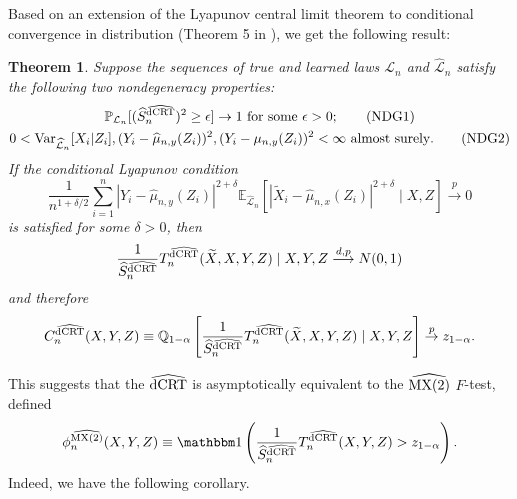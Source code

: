 \documentclass[aos]{imsart}
\theoremstyle{plain}
\newtheorem{theorem}{Theorem}
\theoremstyle{remark}
\newcommand{\E}{\mathbb E}								%
\newcommand{\V}{\mathrm{Var}}							%
\renewcommand{\P}{\mathbb{P}}							%
\newcommand{\Q}{\mathbb{Q}}								%
\newcommand{\indicator}{\mathbbm 1}						%
\newcommand{\convp}{\overset p \rightarrow}             %
\newcommand{\srx}{X}									%
\newcommand{\srz}{Z}									%
\newcommand{\srxk}{\widetilde X}						%
\newcommand{\sry}{Y}									%
\newcommand{\law}{\mathcal L}							%
\newcommand{\lawhat}{\widehat{\mathcal L}}				%
\newcommand{\dCRThat}{\widehat{\textnormal{dCRT}}}		%
\newcommand{\MXtwohat}{\widehat{\textnormal{MX(2)}}}	%
\newcommand{\convdp}{\overset {d,p} \longrightarrow}    %
\begin{document}
Based on an extension of the Lyapunov central limit theorem to conditional convergence in distribution (Theorem 5 in \cite{supplementary}), we get the following result:
\begin{theorem} \label{thm:normal-limit}
    Suppose the sequences of true and learned laws $\law_n$ and $\lawhat_n$ satisfy the following two nondegeneracy properties:
    \begin{gather}
        \P_{\law_n}[(\widehat S_{n}^{\dCRThat})^2 \geq \epsilon] \rightarrow 1 \ \text{for some } \epsilon > 0
        \label{eq:var-bounded-below}; \tag{NDG1} \\
        0 < \V_{\lawhat_n}[\srx_i|\srz_i], (\sry_i - \widehat \mu_{n, y}(\srz_i))^2, (\sry_i - \mu_{n, y}(\srz_i))^2 < \infty \ \text{almost surely}. \label{eq:variance-bounds} \tag{NDG2}
    \end{gather}
    If the conditional Lyapunov condition
    \begin{equation}
        \frac{1}{n^{1+\delta/2}} \sum_{i=1}^n |\sry_i-\widehat\mu_{n,y}(\srz_i)|^{2+\delta}\E_{\lawhat_n}\left[|\srxk_i-\widehat\mu_{n,x}(\srz_i)|^{2+\delta}\mid \srx,\srz\right] \convp 0
        \label{eq:lyapunov-condition} \tag{Lyap-1}
    \end{equation}
    is satisfied for some $\delta > 0$, then
    \begin{equation}
        \frac{1}{\widehat S_{n}^{\dCRThat}}T_n^{\dCRThat}(\srxk, \srx, \sry, \srz) \mid \srx, \sry, \srz \convdp N(0,1)
        \label{eq:conditional-convergence}
    \end{equation}
    and therefore
    \begin{equation}
        C^{\dCRThat}_n(\srx, \sry, \srz) \equiv \Q_{1-\alpha}\left[\frac{1}{\widehat S_{n}^{\dCRThat}}T_n^{\dCRThat}(\srxk, \srx, \sry, \srz) \mid \srx, \sry, \srz\right] \convp z_{1-\alpha}.
        \label{eq:critical-value-convergence}
    \end{equation}
\end{theorem}

This suggests that the $\dCRThat$ is asymptotically equivalent to the $\MXtwohat$ $F$-test, defined
\begin{equation}
    \phi_n^{\MXtwohat}(\srx,\sry,\srz) \equiv \indicator\left(\frac{1}{\widehat S_{n}^{\dCRThat}}T_n^{\dCRThat}(\srx, \sry, \srz) > z_{1-\alpha}\right).
    \label{eq:mx-2-f-test}
\end{equation}
Indeed, we have the following corollary.
\end{document}
